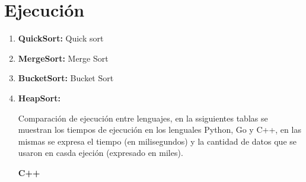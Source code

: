 \documentclass{article}
\begin{document}
    \section{Ejecución}\label{sec:ejecucion}
            \begin{enumerate}
                \item \textbf{QuickSort:} 
                    Quick sort
                \item \textbf{MergeSort:}
                    Merge Sort
                \item \textbf{BucketSort:}
                    Bucket Sort
                \item \textbf{HeapSort:}
                
                Comparación de ejecución entre lenguajes, en la ssiguientes tablas se muestran los tiempos de ejecución en los lenguales Python, Go y C++, en las mismas se expresa el tiempo (en milisegundos) y la cantidad de datos que se usaron en casda ejeción (expresado en miles).
                
                \textbf{C++}
                

\end{enumerate}
\end{document}

